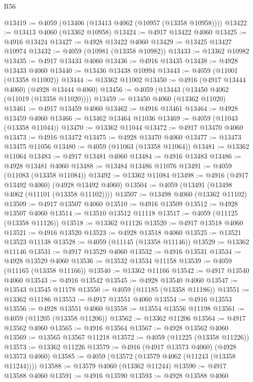 \begin{lexlean}{R56}
\begin{coremodule}
@13419 := @4059 (@13406 (@13413 @4062 (@10957 (@13358 @10958))))
@13422 := @13413 @4060 (@13362 @10958)
@13424 := @4917 @13422 @4060
@13425 := @4916 @13424
@13427 := @4928 @13422 @4060
@13429 := @13425 @13427 @10974
@13432 := @4059 (@10981 (@13358 @10982))
@13433 := @13362 @10982
@13435 := @4917 @13433 @4060
@13436 := @4916 @13435
@13438 := @4928 @13433 @4060
@13440 := @13436 @13438 @10994
@13443 := @4059 (@11001 (@13358 @11002))
@13444 := @13362 @11002
@13450 := @4916 (@4917 @13444 @4060) (@4928 @13444 @4060)
@13456 := @4059 (@13443 (@13450 @4062 (@11019 (@13358 @11020))))
@13459 := @13450 @4060 (@13362 @11020)
@13461 := @4917 @13459 @4060
@13462 := @4916 @13461
@13464 := @4928 @13459 @4060
@13466 := @13462 @13464 @11036
@13469 := @4059 (@11043 (@13358 @11044))
@13470 := @13362 @11044
@13472 := @4917 @13470 @4060
@13473 := @4916 @13472
@13475 := @4928 @13470 @4060
@13477 := @13473 @13475 @11056
@13480 := @4059 (@11063 (@13358 @11064))
@13481 := @13362 @11064
@13483 := @4917 @13481 @4060
@13484 := @4916 @13483
@13486 := @4928 @13481 @4060
@13488 := @13484 @13486 @11076
@13491 := @4059 (@11083 (@13358 @11084))
@13492 := @13362 @11084
@13498 := @4916 (@4917 @13492 @4060) (@4928 @13492 @4060)
@13504 := @4059 (@13491 (@13498 @4062 (@11101 (@13358 @11102))))
@13507 := @13498 @4060 (@13362 @11102)
@13509 := @4917 @13507 @4060
@13510 := @4916 @13509
@13512 := @4928 @13507 @4060
@13514 := @13510 @13512 @11118
@13517 := @4059 (@11125 (@13358 @11126))
@13518 := @13362 @11126
@13520 := @4917 @13518 @4060
@13521 := @4916 @13520
@13523 := @4928 @13518 @4060
@13525 := @13521 @13523 @11138
@13528 := @4059 (@11145 (@13358 @11146))
@13529 := @13362 @11146
@13531 := @4917 @13529 @4060
@13532 := @4916 @13531
@13534 := @4928 @13529 @4060
@13536 := @13532 @13534 @11158
@13539 := @4059 (@11165 (@13358 @11166))
@13540 := @13362 @11166
@13542 := @4917 @13540 @4060
@13543 := @4916 @13542
@13545 := @4928 @13540 @4060
@13547 := @13543 @13545 @11178
@13550 := @4059 (@11185 (@13358 @11186))
@13551 := @13362 @11186
@13553 := @4917 @13551 @4060
@13554 := @4916 @13553
@13556 := @4928 @13551 @4060
@13558 := @13554 @13556 @11198
@13561 := @4059 (@11205 (@13358 @11206))
@13562 := @13362 @11206
@13564 := @4917 @13562 @4060
@13565 := @4916 @13564
@13567 := @4928 @13562 @4060
@13569 := @13565 @13567 @11218
@13572 := @4059 (@11225 (@13358 @11226))
@13573 := @13362 @11226
@13579 := @4916 (@4917 @13573 @4060) (@4928 @13573 @4060)
@13585 := @4059 (@13572 (@13579 @4062 (@11243 (@13358 @11244))))
@13588 := @13579 @4060 (@13362 @11244)
@13590 := @4917 @13588 @4060
@13591 := @4916 @13590
@13593 := @4928 @13588 @4060

\end{coremodule}
\end{lexlean}
